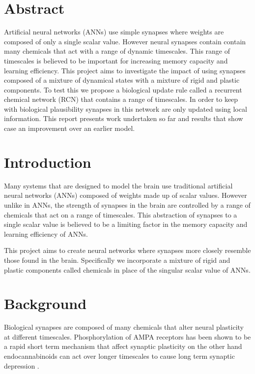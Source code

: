 \documentclass[a4paper, 11pt, oneside]{report}
\begin{document}
\section*{Abstract}
Artificial neural networks (ANNs) use simple synapses where weights 
are composed of only a single scalar value. However neural synapses contain contain many chemicals that act with a range of dynamic timescales.
This range of timescales is believed to be important for increasing memory capacity and learning efficiency.
This project aims to investigate the impact of using synapses composed of a mixture of dynamical states with a mixture of rigid and plastic
components. To test this we propose a biological update rule called a
recurrent chemical network (RCN) that contains a range of timescales. In order to 
keep with biological plausibility synapses in this network are only updated using local
information. This report presents work undertaken so far and results that show case
an improvement over an earlier model.
\endgroup

\section*{Introduction}

Many systems that are designed to model the brain use traditional artificial neural networks (ANNs) composed of weights made up of scalar values.
However unlike in ANNs, the strength of synapses in the brain are controlled by a range of chemicals that act on a range of timescales.
This abstraction of synapses to a single scalar value is believed to be a limiting factor in the memory capacity and learning efficiency of ANNs.

This project aims to create neural networks where synapses more closely resemble those found in the brain.
Specifically we incorporate a mixture of rigid and plastic components called chemicals
in place of the singular scalar value of ANNs.

\section*{Background}

Biological synapses are composed of many chemicals \cite{1101675601} that alter 
neural plasticity at different timescales.
Phosphorylation of AMPA receptors has been shown to be a rapid short term mechanism 
that affect synaptic plasticity \cite{wang2005}
on the other hand endocannabinoids can act over longer timescales to cause
long term synaptic depression \cite{chevaleyre2007}.
\end{document}
